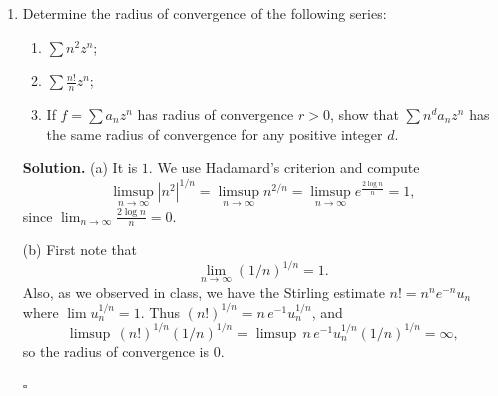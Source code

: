 \documentclass[12pt, reqno]{amsart}
\theoremstyle{definition}
\newenvironment{solution}
  {\par\smallskip\begin{tcolorbox}[breakable, enhanced, colback=solblue, colframe=solframe,
     boxrule=0.5pt, arc=2pt, left=6pt, right=6pt, top=4pt, bottom=4pt]\noindent\textbf{Solution.}}
  {\hfill$\square$\end{tcolorbox}\par\medskip}
\numberwithin{equation}{subsection}
\numberwithin{equation}{section}
\begin{document}
\begin{enumerate}
\begin{solution}
\medskip
Defining $F(T)$ as in the problem, we find
\begin{align*}
u_1TF(T)&=\sum_{n\geq1}u_1a_{n-1}T^n=u_1a_0T+u_1a_1T^2+\cdots,\\
u_2T^2F(T)&=\sum_{n\geq2}u_2a_{n-2}T^n=u_2a_0T^2+u_2a_1T^3+\cdots,
\end{align*}
and therefore, using the recursion for the coefficients of $T^n$ with $n\geq2$, we have (formally)
\[
F(T)-a_0-a_1T=u_1TF(T)-u_1a_0T+u_2T^2F(T).
\]
Solving for $F(T)$ we find
\begin{equation}\label{sol:F}
F(T)=\frac{a_0+a_1T-u_1a_0T}{1-u_1T-u_2T^2},
\end{equation}
so $F=f/g$ with $f(T)=a_0+(a_1-u_1a_0)T$ and $g(T)=1-u_1T-u_2T^2$; note $g\neq0$ since its constant term is $1$.
From \eqref{u:alpha} we find that
\[
(1-\alpha T)(1-\alpha'T)=1-(\alpha+\alpha')T+\alpha\alpha'T^2=1-u_1T-u_2T^2,
\]
so that
\[
F(T)=\frac{a_0+a_1T-u_1a_0T}{(1-\alpha T)(1-\alpha'T)}=\boxed{\frac{A}{1-\alpha T}+\frac{B}{1-\alpha'T}},
\]
with $A,B$ as in \eqref{A:B}. This last equality follows immediately from clearing denominators and using \eqref{u:alpha}
and \eqref{a12}: indeed $A(1-\alpha'T)+B(1-\alpha T)=(A+B)-(A\alpha'+B\alpha)T$, and
$A\alpha'+B\alpha=(A+B)(\alpha+\alpha')-(A\alpha+B\alpha')=u_1a_0-a_1$.
(Alternatively, expand each term as a geometric series, $\frac{A}{1-\alpha T}=\sum A\alpha^nT^n$, and compare with \eqref{an}.)
\end{solution}

\item Determine the radius of convergence of the following series:
\begin{enumerate}
\item $\displaystyle\sum n^2z^n$;
\item $\displaystyle\sum \frac{n!}{n}z^n$;
\item If $f=\sum a_nz^n$ has radius of convergence $r>0$, show that $\sum n^da_nz^n$ has the same radius of convergence for any positive integer $d$.
\end{enumerate}

\begin{solution}
\noindent (a) It is $\boxed{1}$. We use Hadamard's criterion and compute
\[
\limsup_{n\to\infty}|n^2|^{1/n}=\limsup_{n\to\infty}n^{2/n}=\limsup_{n\to\infty}e^{\frac{2\log n}{n}}=1,
\]
since $\lim_{n\to\infty}\frac{2\log n}{n}=0$.

\medskip
\noindent (b) First note that
\[
\lim_{n\to\infty}(1/n)^{1/n}=1 .
\]
Also, as we observed in class, we have the Stirling estimate $n!=n^ne^{-n}u_n$ where $\lim u_n^{1/n}=1$. Thus
$(n!)^{1/n}=n\,e^{-1}u_n^{1/n}$, and
\[
\limsup\,(n!)^{1/n}(1/n)^{1/n}=\limsup\,n\,e^{-1}u_n^{1/n}(1/n)^{1/n}=\infty,
\]
so the radius of convergence is $\boxed{0}$.


\end{solution}
\end{enumerate}
\end{document}
